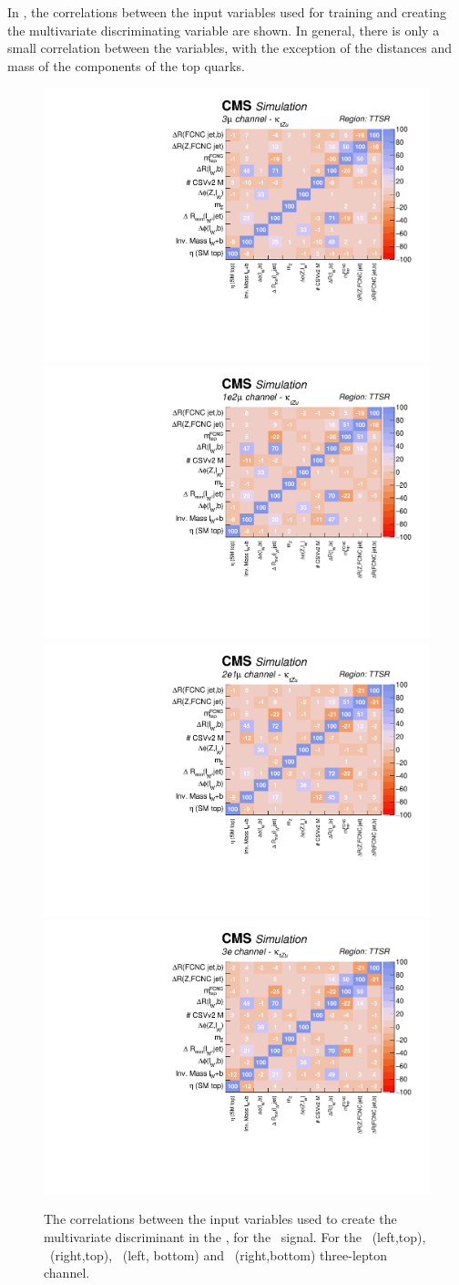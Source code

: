 \newpage
In , the correlations between the input variables used for training and creating the multivariate discriminating variable are shown. In general, there is only a small correlation between the variables, with the exception of the distances and mass of the components of the top quarks. 
\begin{figure}[htbp]
	\centering
	\includegraphics[width=0.49\linewidth]{6_Search/Figures/PlotsTechnics/correlationsigZuttoppairuuu}
	\includegraphics[width=0.49\linewidth]{6_Search/Figures/PlotsTechnics/correlationsigZuttoppairuue}
	\includegraphics[width=0.49\linewidth]{6_Search/Figures/PlotsTechnics/correlationsigZuttoppaireeu}
	\includegraphics[width=0.49\linewidth]{6_Search/Figures/PlotsTechnics/correlationsigZuttoppaireee}
	\caption{The correlations between the input variables used to create the multivariate discriminant in the \TTSR, for the \Zut\ signal. For the \mumumu\ (left,top), \emumu\ (right,top), \eemu\ (left, bottom) and \eee\ (right,bottom) three-lepton channel.}
	\label{fig:correlationsigzuttoppair}
\end{figure}

